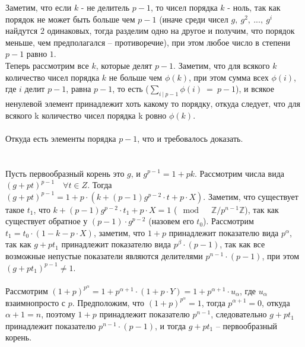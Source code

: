 		Заметим, что если $k$ - не делитель $p-1$, то чисел порядка $k$ - ноль, так как порядок не может быть больше чем $p-1$ (иначе среди чисел $g,\ g^2,\ ...,\ g^i$ найдутся $2$ одинаковых, тогда разделим одно на другое и получим, что порядок меньше, чем предполагался -- противоречие), при этом любое число в степени $p-1$ равно $1$.\\
		Теперь рассмотрим все $k$, которые делят $p-1$. Заметим, что для всякого $k$ количество чисел порядка $k$ не больше чем $\phi(k)$, при этом сумма всех $\phi(i)$, где $i$ делит $p-1$, равна $p-1$, то есть ($\sum_{i \: | \: p-1} \phi(i) \: = \: p-1$), и всякое ненулевой элемент принадлежит хоть какому то порядку, откуда следует, что для всякого k количество чисел порядка k ровно $\phi(k)$. \\
		\\
		Откуда есть элементы порядка $p-1$, что и требовалось доказать.\\
		\\ \\
		Пусть первообразный корень это $g$, и $g^{p-1} = 1 + pk$. Рассмотрим числа вида $(g + pt)^{p-1} \quad \forall t \in Z$. Тогда $(g + pt)^{p-1} = 1 + p \cdot (k + (p-1)g^{p-2} \cdot t + p \cdot X)$. Заметим, что существует такое $t_1$, что $k + (p-1)g^{p-2} \cdot t_1 + p \cdot X = 1$ ($\mod \quad \mathbb{Z}/p^{n-1} \mathbb{Z}$), так как существует обратное у $(p-1) \cdot g^{p-2}$ (назовем его $t_0$). Рассмотрим $t_1 = t_0 \cdot (1 - k - p \cdot X)$, заметим, что $1+p$ принадлежит показателю вида $p^\alpha$, так как $g + pt_1$ принадлежит показателю вида $p^\beta \cdot (p-1)$, так как все возможные непустые показатели являются делителями $p^{n-1} \cdot (p-1)$, при этом $(g + pt_1)^{p-1} \ne 1$. \\ \\
		Рассмотрим $(1+p) ^{p^{\alpha}} = 1 + p^{\alpha + 1} \cdot (1 + p \cdot Y) = 1 + p^{\alpha + 1} \cdot u_{\alpha}$, где $u_{\alpha}$ взаимнопросто с $p$. Предположим, что $(1+p) ^{p^{\alpha}} = 1$, тогда $p^{\alpha + 1} = 0$, откуда $\alpha + 1 = n$, поэтому $1 + p$ принадлежит показателю $p^{n-1}$, следовательно $g + pt_1$ принадлежит показателю $p^{n-1} \cdot (p-1)$, и тогда $g + pt_1$ -- первообразный корень.\\
		\\